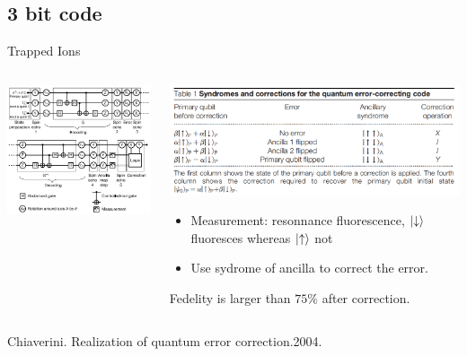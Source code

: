 \documentclass[aspectratio=169,10pt]{beamer}
\begin{document}
\subsection{3 bit code}
\begin{frame}{Trapped Ions}
    \begin{columns}
        \begin{column}{0.45\textwidth}
            \centering
            \includegraphics[width=\columnwidth]{figure/qec.png}
        \end{column}
        \begin{column}{0.55\textwidth}
            \centering
            \includegraphics[width=\columnwidth]{figure/qec11.png}
            \begin{itemize}
                \item Measurement: resonnance fluorescence, $\ket{\downarrow}$ fluoresces whereas $\ket{\uparrow}$ not
                \item Use sydrome of ancilla to correct the error.
            \end{itemize}
            Fedelity is larger than $75\%$ after correction.
        \end{column}
    \end{columns}
\tiny{Chiaverini. Realization of quantum error correction.2004.}
\end{frame}
\end{document}
